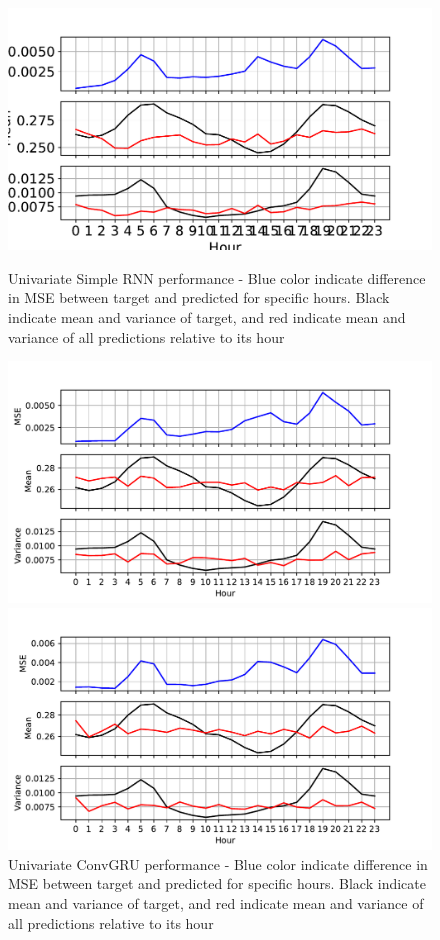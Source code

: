 \documentclass
[twocolumn,
secnumarabic,
nobibnotes,
aps,
prl,
reprint,
groupedaddress,
amsmath,
amssymb,
]{revtex4-2}
\begin{document}
\begin{figure}
  \includegraphics[width=\columnwidth]{figures/univariate_hourly_stats_RNN.pdf}
  \caption{\label{fig:univariate_hourly_stats_RNN} Univariate Simple RNN performance - Blue color indicate difference in MSE between target and predicted for specific hours. Black indicate mean and variance of target, and red indicate mean and variance of all predictions relative to its hour}
  \includegraphics[width=\columnwidth]{figures/univariate_hourly_stats_convGRU.pdf}
  \caption{\label{fig:univariate_hourly_stats_convGRU} Univariate ConvGRU performance - Blue color indicate difference in MSE between target and predicted for specific hours. Black indicate mean and variance of target, and red indicate mean and variance of all predictions relative to its hour}
  \includegraphics[width=\columnwidth]{figures/univariate_hourly_stats_LSTM.pdf}

\end{figure}
\end{document}
